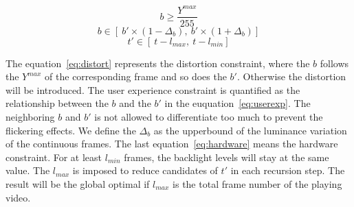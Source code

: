 \begin{equation}
  \label{eq:distort}
  b \ge \frac{Y^{max}}{255}
\end{equation}
\begin{equation}
  \label{eq:userexp}
  b \in [\ b' \times ( 1 - \Delta_b ),\ b' \times ( 1 +
    \Delta_b)]
\end{equation}
\begin{equation}
  \label{eq:hardware}
  t' \in [\ t - l_{max},\ t - l_{min}] 
\end{equation}


The equation~\ref{eq:distort} represents the distortion constraint,
where the $b$ follows the $Y^{max}$ of the corresponding frame and
so does the $b'$. Otherwise the distortion will be introduced. The
user experience constraint is quantified as the relationship between
the $b$ and the $b'$ in the euquation~\ref{eq:userexp}. The neighboring
$b$ and $b'$ is not allowed to differentiate too much to prevent the
flickering effects. We define the $\Delta_b$ as the upperbound of the
luminance variation of the continuous frames. The last equation~\ref{eq:hardware}
means the hardware constraint. For at least $l_{min}$ frames, the
backlight levels will stay at the same value. The $l_{max}$ is imposed
to reduce candidates of $t'$ in each recursion step. The result will
be the global optimal if $l_{max}$ is the total frame number of the
playing video. 


